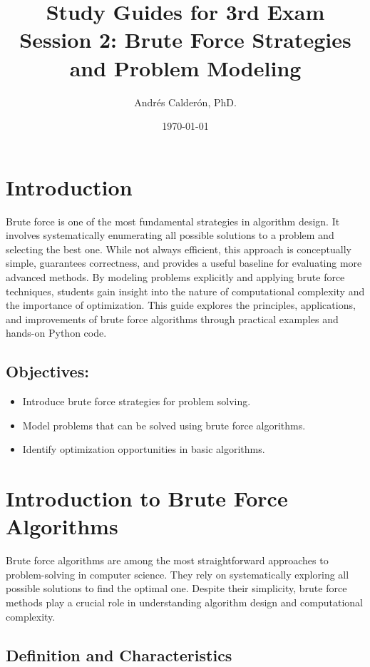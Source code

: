 \documentclass[12pt]{article}
\title{Study Guides for 3rd Exam \\ Session 2: Brute Force Strategies and Problem Modeling}
\author{Andrés Calderón, PhD.}
\date{\today}
\begin{document}
    \maketitle

    \section*{Introduction}
    Brute force is one of the most fundamental strategies in algorithm design. It involves systematically enumerating all possible solutions to a problem and selecting the best one. While not always efficient, this approach is conceptually simple, guarantees correctness, and provides a useful baseline for evaluating more advanced methods. By modeling problems explicitly and applying brute force techniques, students gain insight into the nature of computational complexity and the importance of optimization. This guide explores the principles, applications, and improvements of brute force algorithms through practical examples and hands-on Python code.

    \subsection*{Objectives:}
        \begin{itemize}
            \item Introduce brute force strategies for problem solving.
            \item Model problems that can be solved using brute force algorithms.
            \item Identify optimization opportunities in basic algorithms.
        \end{itemize}

    \section{Introduction to Brute Force Algorithms}
    Brute force algorithms are among the most straightforward approaches to problem-solving in computer science. They rely on systematically exploring all possible solutions to find the optimal one. Despite their simplicity, brute force methods play a crucial role in understanding algorithm design and computational complexity.

    \subsection{Definition and Characteristics}
\end{document}
